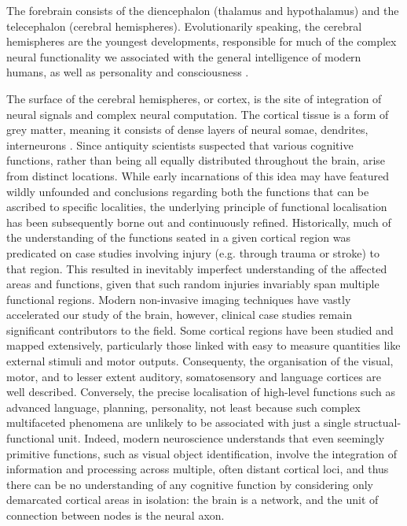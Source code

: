 The forebrain consists of the diencephalon (thalamus and hypothalamus) and the telecephalon (cerebral hemispheres).
Evolutionarily speaking, the cerebral hemispheres are the youngest developments, responsible for much of the complex neural functionality we associated with the general intelligence of modern humans, as well as personality and consciousness .

The surface of the cerebral hemispheres, or cortex, is the site of integration of neural signals and complex neural computation.
The cortical tissue is a form of grey matter, meaning it consists of dense layers of neural somae, dendrites, interneurons .
Since antiquity  scientists suspected that various cognitive functions, rather than being all equally distributed throughout the brain, arise from distinct locations.
While early incarnations of this idea may have featured wildly unfounded and  conclusions regarding both the functions that can be ascribed to specific localities, the underlying principle of functional localisation has been subsequently borne out and continuously refined.
Historically, much of the understanding of the functions seated in a given cortical region was predicated on case studies involving injury (e.g. through trauma or stroke) to that region.
This resulted in inevitably imperfect understanding of the affected areas and functions, given that such random injuries invariably span multiple functional regions. 
Modern non-invasive imaging techniques  have vastly accelerated our study of the brain, however, clinical case studies remain significant contributors to the field. 
Some cortical regions have been studied and mapped extensively, particularly those linked with easy to measure quantities like external stimuli and motor outputs.
Consequenty, the organisation of the visual, motor, and to lesser extent  auditory, somatosensory and  language cortices are well described.
Conversely, the precise localisation of high-level functions such as advanced language, planning, personality, not least because such complex multifaceted phenomena are unlikely to be associated with just a single structual-functional unit.
Indeed, modern neuroscience understands that even seemingly primitive functions, such as visual object identification, involve the integration of information and processing across multiple, often distant cortical loci, and thus there can be no understanding of any cognitive function by considering only  demarcated cortical areas in isolation: the brain is a network, and the unit of connection between nodes is the neural axon.


